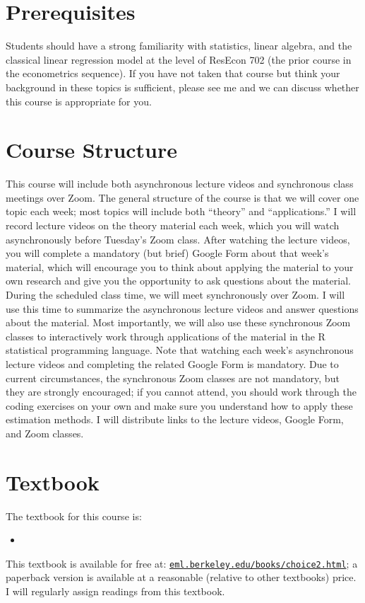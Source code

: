 \documentclass[11pt,letterpaper]{article}
\begin{document}
\section*{Prerequisites}

Students should have a strong familiarity with statistics, linear algebra, and the classical linear regression model at the level of ResEcon 702 (the prior course in the econometrics sequence). If you have not taken that course but think your background in these topics is sufficient, please see me and we can discuss whether this course is appropriate for you.

\section*{Course Structure}

This course will include both asynchronous lecture videos and synchronous class meetings over Zoom. The general structure of the course is that we will cover one topic each week; most topics will include both ``theory'' and ``applications.'' I will record lecture videos on the theory material each week, which you will watch asynchronously before Tuesday's Zoom class. After watching the lecture videos, you will complete a mandatory (but brief) Google Form about that week's material, which will encourage you to think about applying the material to your own research and give you the opportunity to ask questions about the material. During the scheduled class time, we will meet synchronously over Zoom. I will use this time to summarize the asynchronous lecture videos and answer questions about the material. Most importantly, we will also use these synchronous Zoom classes to interactively work through applications of the material in the R statistical programming language. Note that watching each week's asynchronous lecture videos and completing the related Google Form is mandatory. Due to current circumstances, the synchronous Zoom classes are not mandatory, but they are strongly encouraged; if you cannot attend, you should work through the coding exercises on your own and make sure you understand how to apply these estimation methods. I will distribute links to the lecture videos, Google Form, and Zoom classes.

\section*{Textbook}

The textbook for this course is:
\begin{itemize}
	\item[] \begin{refsection} \nocite{trainDiscreteChoiceMethods2009} \printbibliography[heading=none] \end{refsection}
\end{itemize}
This textbook is available for free at: \href{https://eml.berkeley.edu/books/choice2.html}{\texttt{eml.berkeley.edu/books/choice2.html}}; a paperback version is available at a reasonable (relative to other textbooks) price. I will regularly assign readings from this textbook. \\
\end{document}
